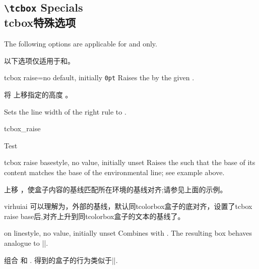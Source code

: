 \setcounter{section}{4}
\setcounter{subsection}{19}
\setcounter{subsubsection}{0}

\subsection{\texttt{\textbackslash tcbox} Specials\\tcbox特殊选项}

The following options are applicable for  and 
only.

以下选项仅适用于和。

\begin{docTcbKey}{tcbox raise}{=}{no default, initially \texttt{0pt}}
Raises the  by the given .

将  上移指定的高度 。

Sets the line width of the right rule to .
\begin{exdispExample}{tcbox_raise}

Test\dotfill
{}\dotfill
{}\dotfill
{}
\end{exdispExample}
\end{docTcbKey}


\begin{docTcbKey}{tcbox raise base}{}{style, no value, initially unset}
Raises the  such that the base of its content matches
the base of the environmental line; see example above.

上移  ，使盒子内容的基线匹配所在环境的基线对齐;请参见上面的示例。

\begin{引述之言}{virhuiai}
可以理解为，外部的基线，默认同tcolorbox盒子的底对齐，设置了tcbox raise base后,对齐上升到同tcolorbox盒子的文本的基线了。
\end{引述之言}
\end{docTcbKey}

\begin{docTcbKey}{on line}{}{style, no value, initially unset}
Combines  with .
The resulting box behaves analogue to |\fbox|.

组合  和 .
得到的盒子的行为类似于|\fbox|.
\end{docTcbKey}




